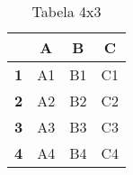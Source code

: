 \begin{table}[htbp]
    \centering
   \begin{tabular}{|c|c|c|c|}
\hline
           & \textbf{A} & \textbf{B} & \textbf{C} \\ \hline
\textbf{1} & A1         & B1         & C1         \\ \hline
\textbf{2} & A2         & B2         & C2         \\ \hline
\textbf{3} & A3         & B3         & C3         \\ \hline
\textbf{4} & A4         & B4         & C4         \\ \hline
    \end{tabular}
    \caption{Tabela 4x3}
    \label{tab:my_tabela}
\end{table}
    


